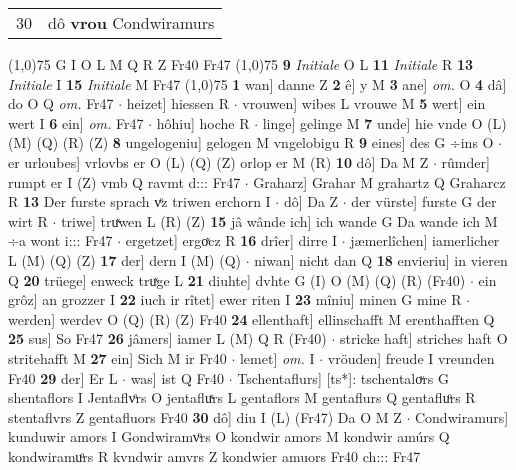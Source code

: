 \documentclass[8pt,a4paper,notitlepage]{article}
\begin{document}
\begin{table}[ht]
\begin{minipage}[t]{0.5\linewidth}
\begin{tabular}{rl}
30 & dô \textbf{vrou} Condwiramurs\\ 
\end{tabular}
\scriptsize
\line(1,0){75} \newline
G I O L M Q R Z Fr40 Fr47 \newline
\line(1,0){75} \newline
\textbf{9} \textit{Initiale} O L  \textbf{11} \textit{Initiale} R  \textbf{13} \textit{Initiale} I  \textbf{15} \textit{Initiale} M Fr47  \newline
\line(1,0){75} \newline
\textbf{1} wan] danne Z \textbf{2} ê] y M \textbf{3} ane] \textit{om.} O \textbf{4} dâ] do O Q \textit{om.} Fr47  $\cdot$ heizet] hiessen R  $\cdot$ vrouwen] wibes L vrouwe M \textbf{5} wert] ein wert I \textbf{6} ein] \textit{om.} Fr47  $\cdot$ hôhiu] hoche R  $\cdot$ linge] gelinge M \textbf{7} unde] hie vnde O (L) (M) (Q) (R) (Z) \textbf{8} ungelogeniu] gelogen M vngelobigu R \textbf{9} eines] des G ÷ins O  $\cdot$ er urloubes] vrlovbs er O (L) (Q) (Z) orlop er M (R) \textbf{10} dô] Da M Z  $\cdot$ rûmder] rumpt er I (Z) vmb Q ravmt d::: Fr47  $\cdot$ Graharz] Grahar M grahartz Q Graharcz R \textbf{13} Der furste sprach vͤz triwen erchorn I  $\cdot$ dô] Da Z  $\cdot$ der vürste] furste G der wirt R  $\cdot$ triwe] truͯwen L (R) (Z) \textbf{15} jâ wânde ich] ich wande G Da wande ich M ÷a wont i::: Fr47  $\cdot$ ergetzet] ergoͯcz R \textbf{16} drîer] dirre I  $\cdot$ jæmerlîchen] iamerlicher L (M) (Q) (Z) \textbf{17} der] dern I (M) (Q)  $\cdot$ niwan] nicht dan Q \textbf{18} envieriu] in vieren Q \textbf{20} trüege] enweck truͯge L \textbf{21} diuhte] dvhte G (I) O (M) (Q) (R) (Fr40)  $\cdot$ ein grôz] an grozzer I \textbf{22} iuch ir rîtet] ewer riten I \textbf{23} mîniu] minen G mine R  $\cdot$ werden] werdev O (Q) (R) (Z) Fr40 \textbf{24} ellenthaft] ellinschafft M erenthafften Q \textbf{25} sus] So Fr47 \textbf{26} jâmers] iamer L (M) Q R (Fr40)  $\cdot$ stricke haft] striches haft O stritehafft M \textbf{27} ein] Sich M ir Fr40  $\cdot$ lemet] \textit{om.} I  $\cdot$ vröuden] freude I vreunden Fr40 \textbf{29} der] Er L  $\cdot$ was] ist Q Fr40  $\cdot$ Tschentaflurs] [ts*]: tschentaloͮrs G shentaflors I Jentaflvͦrs O jentafluͯrs L gentaflors M gentaflurs Q gentafluͦrs R stentaflvrs Z gentafluors Fr40 \textbf{30} dô] diu I (L) (Fr47) Da O M Z  $\cdot$ Condwiramurs] kunduwir amors I Gondwiramvͦrs O kondwir amors M kondwir amúrs Q kondwiramuͦrs R kvndwir amvrs Z kondwier amuors Fr40 ch::: Fr47 \newline
\end{minipage}

\end{table}
\end{document}
